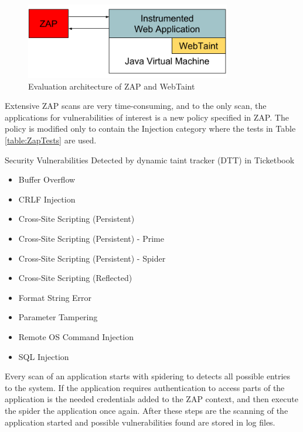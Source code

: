 \begin{figure}[H]
    \centering
    \includegraphics[width=0.8\textwidth]{images/ZAPArchitecture.png}
    \caption{Evaluation architecture of ZAP and WebTaint}
    \label{fig:ZAP}
\end{figure}

Extensive ZAP scans are very time-consuming, and to the only scan, the applications for vulnerabilities of interest is a new policy specified in ZAP. The policy is modified only to contain the Injection category where the tests in Table \ref{table:ZapTests} are used.

\begin{table}[H]
  \centering
  \caption{Security Vulnerabilities Detected by dynamic taint tracker (DTT) in Ticketbook}
    \label{table:ZapTests}
    \begin{itemize}
        \item Buffer Overflow
        \item CRLF Injection
        \item Cross-Site Scripting (Persistent)
        \item Cross-Site Scripting (Persistent) - Prime
        \item Cross-Site Scripting (Persistent) - Spider
        \item Cross-Site Scripting (Reflected)
        \item Format String Error
        \item Parameter Tampering
        \item Remote OS Command Injection
        \item SQL Injection
    \end{itemize}
\end{table}

Every scan of an application starts with spidering to detects all possible entries to the system. If the application requires authentication to access parts of the application is the needed credentials added to the ZAP context, and then execute the spider the application once again. After these steps are the scanning of the application started and possible vulnerabilities found are stored in log files.

